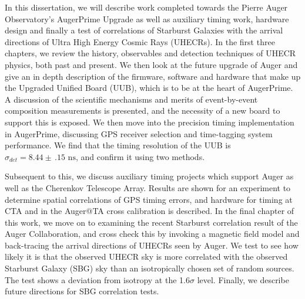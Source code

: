 
\newpage
\begin{center}
		\begin{singlespace}
	{\huge\thetitle\unskip\strut\par}
		\end{singlespace}
	{%
	\large%
	{\expandafter\MakeUppercase\expandafter{\theauthor}}%
	\unskip\strut\par%

	}
\end{center}

\bigskip
\begin{center}
	\bfseries \abstractname\vspace{-.5em}\vspace{0pt}
\end{center}
In this dissertation, we will describe work completed towards the Pierre Auger Observatory's AugerPrime Upgrade as well as auxiliary timing work, hardware design and finally a test of correlations of Starburst Galaxies with the arrival directions of Ultra High Energy Cosmic Rays (UHECRs). In the first three chapters, we review the history, observables and detection techniques of UHECR physics, both past and present. We then look at the future upgrade of Auger and give an in depth description of the firmware, software and hardware that make up the Upgraded Unified Board (UUB), which is to be at the heart of AugerPrime. A discussion of the scientific mechanisms and merits of event-by-event composition measurements is presented, and the necessity of a new board to support this is exposed. We then move into the precision timing implementation in AugerPrime, discussing GPS receiver selection and time-tagging system performance. We find that the timing resolution of the UUB is $\sigma_{det}=8.44\pm\,.15\mbox{ ns}$, and confirm it using two methods. 

Subsequent to this, we discuss auxiliary timing projects which support Auger as well as the Cherenkov Telescope Array. Results are shown for an experiment to determine spatial correlations of GPS timing errors, and hardware for timing at CTA and in the Auger@TA cross calibration is described. In the final chapter of this work, we move on to examining the recent Starburst correlation result of the Auger Collaboration, and cross check this by invoking a magnetic field model and back-tracing the arrival directions of UHECRs seen by Auger. We test to see how likely it is that the observed UHECR sky is more correlated with the observed Starburst Galaxy (SBG) sky than an isotropically chosen set of random sources. The test shows a deviation from isotropy at the 1.6$\sigma$ level. Finally, we describe future directions for SBG correlation tests.
